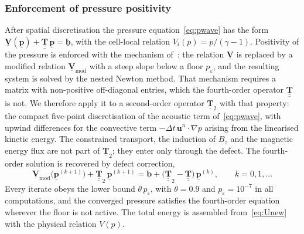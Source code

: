 \documentclass[a4paper,fleqn]{cas-sc}
\theoremstyle{remark}
\newtheorem{remark}[theorem]{Remark}
\begin{document}
\subsubsection{Enforcement of pressure positivity}
\label{sec:nestednewton}

After spatial discretisation the pressure equation~\eqref{eq:pwave} has the form
$\underline{\mathbf V}(\underline{\mathbf p})
+\underline{\underline{\mathbf T}}\,\underline{\mathbf p}=\underline{\mathbf b}$,
with the cell-local relation $V_i(p)=p/(\gamma-1)$. Positivity of the pressure is
enforced with the mechanism of~\cite{MHDIMEX}: the relation
$\underline{\mathbf V}$ is replaced by a modified relation
$\underline{\mathbf V}_{\mathrm{mod}}$ with a steep slope below a floor
$p_\varepsilon$, and the resulting system is solved by the nested Newton method.
That mechanism requires a matrix with non-positive off-diagonal entries, which
the fourth-order operator $\underline{\underline{\mathbf T}}$ is not. We therefore apply it to a second-order operator $\underline{\mathbf T}_2$
with that property: the compact five-point discretisation of the acoustic
term of~\eqref{eq:pwave}, with upwind differences for the convective term
$-\Delta t\,\mathbf u^{n}\!\cdot\!\nabla p$ arising from the linearised
kinetic energy. The constrained transport, the induction of $B_z$ and the
magnetic energy flux are not part of $\underline{\mathbf T}_2$; they enter
only through the defect. The fourth-order solution is recovered by defect
correction,
\begin{equation}
\label{eq:defect}
\underline{\mathbf V}_{\mathrm{mod}}\big(\underline{\mathbf p}^{(k+1)}\big)
+\underline{\underline{\mathbf T}}_{2}\,\underline{\mathbf p}^{(k+1)}
=\underline{\mathbf b}
+\big(\underline{\underline{\mathbf T}}_{2}-\underline{\underline{\mathbf T}}\big)\,
\underline{\mathbf p}^{(k)},
\qquad k=0,1,\dots
\end{equation}
Every iterate obeys the lower bound $\theta\,p_\varepsilon$, with
$\theta=0.9$ and $p_\varepsilon=10^{-7}$ in all computations, and the converged pressure satisfies the fourth-order equation wherever the floor is not active. The total energy is
assembled from~\eqref{eq:Unew} with the physical relation $V(p)$.

\end{document}
